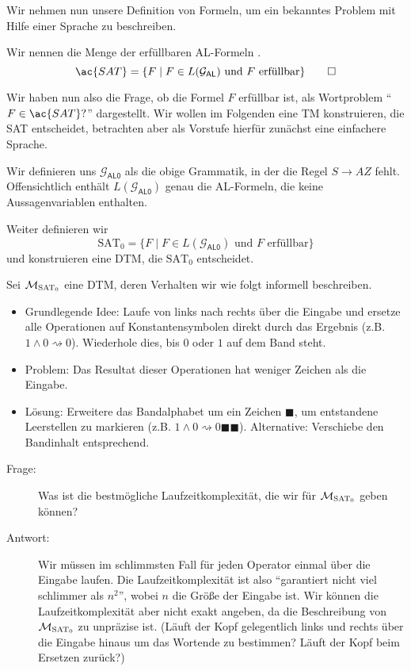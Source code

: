 Wir nehmen nun unsere Definition von Formeln, um ein bekanntes Problem mit Hilfe einer Sprache zu beschreiben.
\begin{Def}
Wir nennen die Menge der erfüllbaren \ac{AL}-Formeln .
\[ \ac{SAT}=\{F\mid F\in L(\mathcal{G}_\mathsf{AL}) \text{ und $F$ erfüllbar}\}\qedhere \]
\end{Def}


Wir haben nun also die Frage, ob die Formel $F$ erfüllbar ist, als Wortproblem "`$F\in \ac{SAT}?$"' dargestellt.
Wir wollen im Folgenden eine \ac{TM} konstruieren, die \ac{SAT} entscheidet, betrachten aber als Vorstufe hierfür zunächst eine einfachere Sprache.


Wir definieren uns $\mathcal{G}_\mathsf{AL0}$ als die obige Grammatik, in der die Regel $S\to AZ$ fehlt.
Offensichtlich enthält $L(\mathcal{G}_\mathsf{AL0})$ genau die \ac{AL}-Formeln, die keine Aussagenvariablen enthalten.

Weiter definieren wir 
$$\text{SAT}_0=\{F\mid F\in L(\mathcal{G}_\mathsf{AL0}) \text{ und $F$ erfüllbar}\}$$
und konstruieren eine \ac{DTM}, die $\text{SAT}_0$ entscheidet.

\begin{Bsp}\label{bsp:DtmSat0}
Sei $\mathcal{M}_{\text{SAT}_0}$ eine \ac{DTM}, deren Verhalten wir wie folgt informell beschreiben.
\begin{itemize}
 \item Grundlegende Idee: Laufe von links nach rechts über die Eingabe und ersetze alle Operationen auf Konstantensymbolen direkt durch das Ergebnis (z.B. $1\land 0\rightsquigarrow 0$).
 Wiederhole dies, bis $0$ oder $1$ auf dem Band steht.
 \item Problem: Das Resultat dieser Operationen hat weniger Zeichen als die Eingabe.
 \item Lösung: Erweitere das Bandalphabet um ein Zeichen $\blacksquare$, um entstandene Leerstellen zu markieren (z.B. $1\land 0\rightsquigarrow 0\blacksquare\blacksquare$). Alternative: Verschiebe den Bandinhalt entsprechend.
 \qedhere
\end{itemize}
\end{Bsp}

\begin{description}
\item[Frage:] Was ist die bestmögliche Laufzeitkomplexität, die wir für $\mathcal{M}_{\text{SAT}_0}$ geben können?

\item[Antwort:] Wir müssen im schlimmsten Fall für jeden Operator einmal über die Eingabe laufen.
Die Laufzeitkomplexität ist also "`garantiert nicht viel schlimmer als $n^2$"', wobei $n$ die Größe der Eingabe ist.
Wir können die Laufzeitkomplexität aber nicht exakt angeben, da die Beschreibung von $\mathcal{M}_{\text{SAT}_0}$ zu unpräzise ist.
(Läuft der Kopf gelegentlich links und rechts über die Eingabe hinaus um das Wortende zu bestimmen?
Läuft der Kopf beim Ersetzen zurück?)
\end{description}


